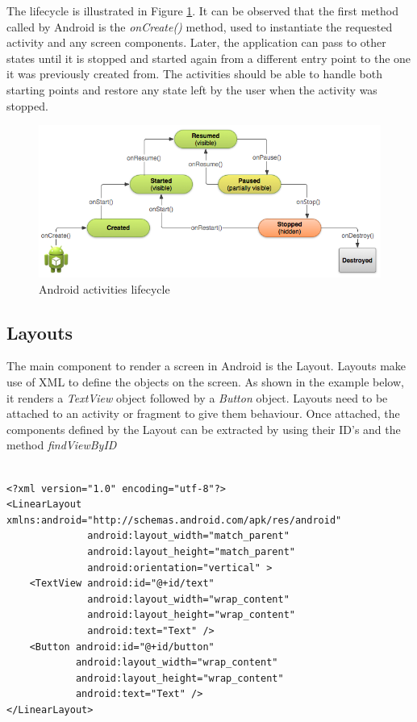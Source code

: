 The lifecycle is illustrated in Figure \ref{fig:activities_lifecycle}. It can be observed that the first method called by Android is the \textit{onCreate()} method, used to instantiate the requested activity and any screen components. Later, the application can pass to other states until it is stopped and started again from a different entry point to the one it was previously created from. The activities should be able to handle both starting points and restore any state left by the user when the activity was stopped. 

\begin{figure}[H]
\begin{adjustbox}{width=1\textwidth,center=\textwidth}
  \centering
  \includegraphics[scale=1]{images/basic-lifecycle.png}
\end{adjustbox}
  \caption[Android activities lifecycle]{Android activities lifecycle\footnotemark}
  \label{fig:activities_lifecycle}
\end{figure}

\subsection{Layouts}
The main component to render a screen in Android is the Layout. Layouts make use of XML to define the objects on the screen. As shown in the example below, it renders a \textit{TextView} object followed by a \textit{Button} object. Layouts need to be attached to an activity or fragment to give them behaviour. Once attached, the components defined by the Layout can be extracted by using their ID's and the method \textit{findViewByID}
\begin{verbatim}

<?xml version="1.0" encoding="utf-8"?>
<LinearLayout xmlns:android="http://schemas.android.com/apk/res/android"
              android:layout_width="match_parent"
              android:layout_height="match_parent"
              android:orientation="vertical" >
    <TextView android:id="@+id/text"
              android:layout_width="wrap_content"
              android:layout_height="wrap_content"
              android:text="Text" />
    <Button android:id="@+id/button"
            android:layout_width="wrap_content"
            android:layout_height="wrap_content"
            android:text="Text" />
</LinearLayout>
\end{verbatim}

